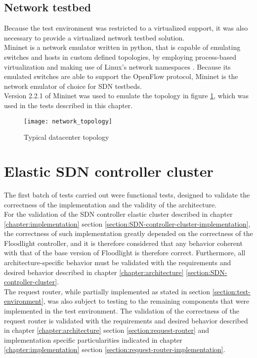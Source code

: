 \subsection{Network testbed}
\label{subsection:Mininet}
Because the test environment was restricted to a virtualized support, it was also necessary to provide a virtualized network testbed solution.\\
Mininet is a network emulator written in python, that is capable of emulating switches and hosts in custom defined topologies, by employing process-based virtualization and making use of Linux's network namespaces \cite{mininet}.
Because its emulated switches are able to support the OpenFlow protocol, Mininet is the network emulator of choice for \gls{SDN} testbeds.\\
Version 2.2.1 of Mininet was used to emulate the topology in figure \ref{fig:network_topology}, which was used in the tests described in this chapter.
%
\begin{figure}
	\centering
	\texttt{[image: network\_topology]}
	\caption{Typical datacenter topology}
	\label{fig:network_topology}
\end{figure}
%
\section{Elastic SDN controller cluster}
\label{section:functional-tests}
The first batch of tests carried out were functional tests, designed to validate the correctness of the implementation and the validity of the architecture.\\
%
For the validation of the \gls{SDN} controller elastic cluster described in chapter \ref*{chapter:implementation} section \ref{section:SDN-controller-cluster-implementation}, the correctness of such implementation greatly depended on the correctness of the Floodlight controller, and it is therefore considered that any behavior coherent with that of the base version of Floodlight is therefore correct.
Furthermore, all architecture-specific behavior must be validated with the requirements and desired behavior described in chapter \ref*{chapter:architecture} \ref{section:SDN-controller-cluster}.\\
%
The request router, while partially implemented as stated in section \ref{section:test-environment}, was also subject to testing to the remaining components that were implemented in the test environment.
The validation of the correctness of the request router is validated with the requirements and desired behavior described in chapter \ref*{chapter:architecture} section \ref{section:request-router} and implementation specific particularities indicated in chapter \ref*{chapter:implementation} section \ref{section:request-router-implementation}.
%
%
